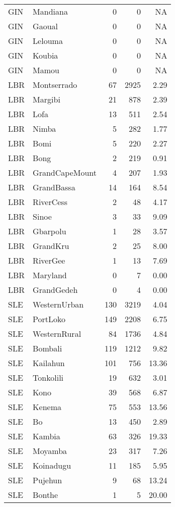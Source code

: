 \documentclass[11pt,oneside,letterpaper]{article}
\begin{document}
\begin{longtable}{ | l | l | r | r | r | }
GIN & Mandiana & 0 & 0 & NA \\
GIN & Gaoual & 0 & 0 & NA \\
GIN & Lelouma & 0 & 0 & NA \\
GIN & Koubia & 0 & 0 & NA \\
GIN & Mamou & 0 & 0 & NA \\
\hline
LBR & Montserrado & 67 & 2925 & 2.29 \\
LBR & Margibi & 21 & 878 & 2.39 \\
LBR & Lofa & 13 & 511 & 2.54 \\
LBR & Nimba & 5 & 282 & 1.77 \\
LBR & Bomi & 5 & 220 & 2.27 \\
LBR & Bong & 2 & 219 & 0.91 \\
LBR & GrandCapeMount & 4 & 207 & 1.93 \\
LBR & GrandBassa & 14 & 164 & 8.54 \\
LBR & RiverCess & 2 & 48 & 4.17 \\
LBR & Sinoe & 3 & 33 & 9.09 \\
LBR & Gbarpolu & 1 & 28 & 3.57 \\
LBR & GrandKru & 2 & 25 & 8.00 \\
LBR & RiverGee & 1 & 13 & 7.69 \\
LBR & Maryland & 0 & 7 & 0.00 \\
LBR & GrandGedeh & 0 & 4 & 0.00 \\
\hline
SLE & WesternUrban & 130 & 3219 & 4.04 \\
SLE & PortLoko & 149 & 2208 & 6.75 \\
SLE & WesternRural & 84 & 1736 & 4.84 \\
SLE & Bombali & 119 & 1212 & 9.82 \\
SLE & Kailahun & 101 & 756 & 13.36 \\
SLE & Tonkolili & 19 & 632 & 3.01 \\
SLE & Kono & 39 & 568 & 6.87 \\
SLE & Kenema & 75 & 553 & 13.56 \\
SLE & Bo & 13 & 450 & 2.89 \\
SLE & Kambia & 63 & 326 & 19.33 \\
SLE & Moyamba & 23 & 317 & 7.26 \\
SLE & Koinadugu & 11 & 185 & 5.95 \\
SLE & Pujehun & 9 & 68 & 13.24 \\
SLE & Bonthe & 1 & 5 & 20.00 \\
\hline
\end{longtable}
\end{document}
